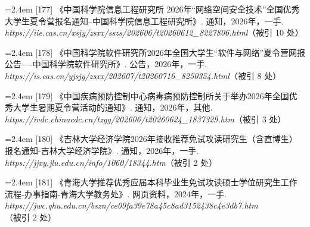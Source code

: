 {\noindent\hangindent=2.4em \label{src:S0219}{\color{cAccent}[177]} 《中国科学院信息工程研究所 2026年“网络空间安全技术”全国优秀大学生夏令营报名通知--中国科学院信息工程研究所》. 通知，2026年，一手. \textit{https://iie.cas.cn/xsjy/zsxx/sszs/202606/t20260612\_8227806.html}（被引 10 处）\par
\vspace{0.6pt}
\noindent\hangindent=2.4em \label{src:S0223}{\color{cAccent}[178]} 《中国科学院软件研究所2026年全国大学生“软件与网络”夏令营网报公告----中国科学院软件研究所》. 公告，2026年，一手. \textit{https://is.cas.cn/yjsjy/zsxx/202607/t20260716\_8250354.html}（被引 8 处）\par
\vspace{0.6pt}
\vspace{3.5pt}\par
\nopagebreak\vspace{1pt}
\noindent\hangindent=2.4em \label{src:S0225}{\color{cAccent}[179]} 《中国疾病预防控制中心病毒病预防控制所关于举办2026年全国优秀大学生暑期夏令营活动的通知》. 通知，2026年，其他. \textit{https://ivdc.chinacdc.cn/tzgg/202606/t20260624\_1837329.htm}（被引 3 处）\par
\vspace{0.6pt}
\vspace{3.5pt}\par
\nopagebreak\vspace{1pt}
\noindent\hangindent=2.4em \label{src:S0228}{\color{cAccent}[180]} 《吉林大学经济学院2026年接收推荐免试攻读研究生（含直博生）报名通知-吉林大学经济学院》. 通知，2026年，一手. \textit{https://jjxy.jlu.edu.cn/info/1060/18344.htm}（被引 2 处）\par
\vspace{0.6pt}
\vspace{3.5pt}\par
\nopagebreak\vspace{1pt}
\noindent\hangindent=2.4em \label{src:S0232}{\color{cAccent}[181]} 《青海大学推荐优秀应届本科毕业生免试攻读硕士学位研究生工作流程-办事指南-青海大学教务处》. 网页资料，2024年，一手. \textit{https://jwc.qhu.edu.cn/bszn/ce09fa39e78a45c8ad3152438c4e3db7.htm}（被引 2 处）\par
\vspace{0.6pt}
\vspace{3.5pt}\par
}
